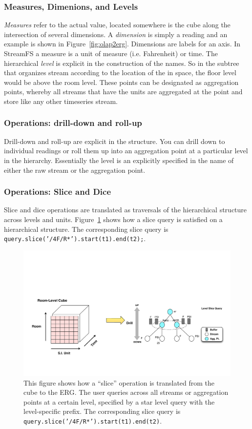 \subsubsection{Measures, Dimenions, and Levels}
\emph{Measures} refer to the actual value, located somewhere is the cube along the intersection of several dimensions.
A \emph{dimension} is simply a reading and an example is shown in Figure~\ref{fig:olap2erg}.  Dimensions 
are labels for an axis.  In StreamFS a measure is a unit of measure (i.e. Fahrenheit) or time.  The hierarchical \emph{level}
is explicit in the construction of the names.  So in the subtree that organizes stream according to the location of the
in space, the floor level would be above the room level.  These points can be designated as aggregation points, whereby
all streams that have the units are aggregated at the point and store like any other timeseries stream.

\subsubsection{Operations: drill-down and roll-up}
Drill-down and roll-up are explicit in the structure.  You can drill down to individual readings or roll them
up into an aggregation point at a particular level in the hierarchy.  Essentially the level is an explicitly specified in the 
name of either the raw stream or the aggregation point.

\subsubsection{Operations: Slice and Dice}
Slice and dice operations are translated as traversals of the hierarchical structure across levels and units.  Figure~\ref{fig:olapslice2ergslice}
shows how a slice query is satisfied on a hierarchical structure.  The corresponding slice query 
is \texttt{query.slice('/4F/R*').start(t1).end(t2);}.

\begin{figure}[h!] %
\centering
\includegraphics[width=1.0\columnwidth]{figs/olapslice2ergslice}
\caption{This figure shows how a ``slice'' operation is translated from the cube to the ERG.  The user queries across all streams or aggregation
points at a certain level, specified by a star level query with the level-specific prefix.  The corresponding slice query is
\texttt{query.slice('/4F/R*').start(t1).end(t2)}.
}
\label{fig:olapslice2ergslice}
\end{figure}


